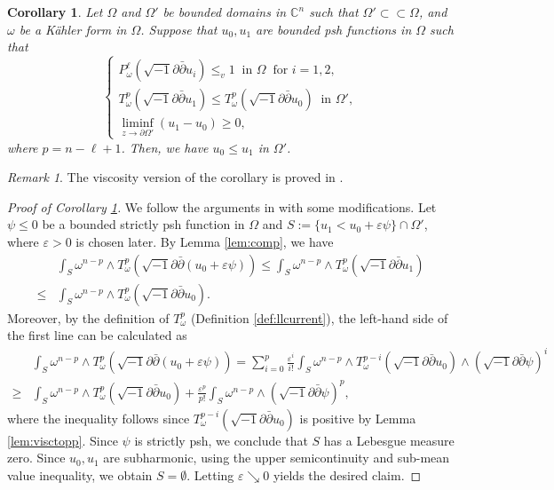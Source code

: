 \documentclass{amsart}
\numberwithin{equation}{section}
\theoremstyle{plain}
\newtheorem{cor}[equation]{Corollary}
\theoremstyle{definition}
\theoremstyle{remark}
\newtheorem{remark}[equation]{Remark}
\newcommand{\delb}{\sqrt{-1}\partial\bar{\partial}}
\begin{document}
\begin{cor}\label{cor:comp}
    Let $\Omega$ and $\Omega'$ be bounded domains in $\mathbb{C}^n$ such that $\Omega'\subset\subset\Omega$, and $\omega$ be a Kähler form in $\Omega$. Suppose that $u_0,u_1$ are bounded psh functions in $\Omega$ such that 
    \begin{equation*}
        \begin{cases}
            P^{\ell}_\omega(\delb u_i)\le_v1 \ \text{ in }\Omega \ \text{ for } i=1,2,\\
            T^p_\omega(\delb u_1)\le T^p_\omega(\delb u_0) \ \text{ in }\Omega',\\
            \liminf_{z\to\partial\Omega'} (u_1-u_0)\ge 0,
        \end{cases}
    \end{equation*}
    where $p=n-\ell+1$. Then, we have $u_0\le u_1$ in $\Omega'$.
\end{cor}

\begin{remark}
    The viscosity version of the corollary is proved in \cite[Theorem 22]{DDT}.
\end{remark}

\begin{proof}[Proof of Corollary \ref{cor:comp}]
    We follow the arguments in \cite[Corollary 4.4]{BT} with some modifications. Let $\psi\le0$ be a bounded strictly psh function in $\Omega$ and $S:=\{u_1<u_0+\varepsilon\psi\}\cap\Omega'$, where $\varepsilon>0$ is chosen later. By Lemma \ref{lem:comp}, we have
    \begin{equation*}
        \begin{aligned}
            &\int_S \omega^{n-p}\wedge T^p_\omega(\delb (u_0+\varepsilon\psi))\le\int_S \omega^{n-p}\wedge T^p_\omega(\delb u_1)\\
            \le&\int_{S}\omega^{n-p}\wedge T^p_\omega(\delb u_0).      
        \end{aligned}
    \end{equation*}
    Moreover, by the definition of $T^p_\omega$ (Definition \ref{def:llcurrent}), the left-hand side of the first line can be calculated as
    \begin{align*}
        &\int_S \omega^{n-p}\wedge T^p_\omega(\delb (u_0+\varepsilon\psi))=\sum_{i=0}^p\frac{\varepsilon^i}{i!}\int_S \omega^{n-p}\wedge T^{p-i}_\omega(\delb u_0)\wedge(\delb\psi)^i\\
        \ge&\int_S \omega^{n-p}\wedge T^p_\omega(\delb u_0)+\frac{\varepsilon^p}{p!}\int_S\omega^{n-p}\wedge(\delb \psi)^p,
    \end{align*}
    where the inequality follows since $T^{p-i}_\omega(\delb u_0)$ is positive by Lemma \ref{lem:visctopp}. Since $\psi$ is strictly psh, we conclude that $S$ has a Lebesgue measure zero. Since $u_0,u_1$ are subharmonic, using the upper semicontinuity and sub-mean value inequality, we obtain $S=\emptyset$. Letting $\varepsilon\searrow0$ yields the desired claim.
\end{proof}
\end{document}

